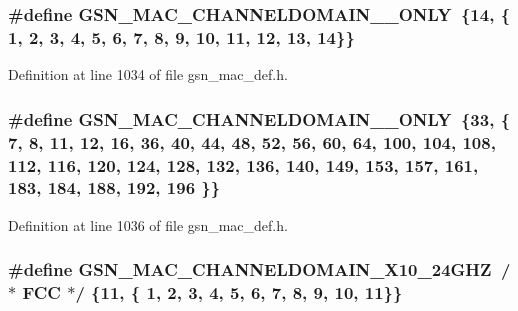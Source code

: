 \hypertarget{a00642_ga1902c2b82dd9530b1f76e7aa03cad775}{
\subsubsection[{GSN\_\-MAC\_\-CHANNELDOMAIN\_\-24\_\-ONLY}]{\setlength{\rightskip}{0pt plus 5cm}\#define GSN\_\-MAC\_\-CHANNELDOMAIN\_\_\-ONLY~\{14, \{ 1,  2,  3,  4,  5,  6,  7,  8,  9, 10, 11, 12, 13, 14\}\}}}
\label{a00642_ga1902c2b82dd9530b1f76e7aa03cad775}


Definition at line 1034 of file gsn\_\-mac\_\-def.h.

\hypertarget{a00642_ga700daf355821d5d26cb0d2f346a1a969}{
\subsubsection[{GSN\_\-MAC\_\-CHANNELDOMAIN\_\-5\_\-ONLY}]{\setlength{\rightskip}{0pt plus 5cm}\#define GSN\_\-MAC\_\-CHANNELDOMAIN\_\_\-ONLY~\{33, \{ 7,  8, 11, 12, 16, 36, 40, 44, 48, 52, 56, 60, 64, 100, 104, 108, 112, 116, 120, 124, 128, 132, 136, 140, 149, 153, 157, 161, 183, 184, 188, 192, 196 \}\}}}
\label{a00642_ga700daf355821d5d26cb0d2f346a1a969}


Definition at line 1036 of file gsn\_\-mac\_\-def.h.

\hypertarget{a00642_gadef528ef0222b55050b526f2acd1e545}{
\subsubsection[{GSN\_\-MAC\_\-CHANNELDOMAIN\_\-X10\_\-24GHZ}]{\setlength{\rightskip}{0pt plus 5cm}\#define GSN\_\-MAC\_\-CHANNELDOMAIN\_\-X10\_\-24GHZ~/$\ast$ FCC    $\ast$/ \{11, \{ 1,  2,  3,  4,  5,  6,  7,  8,  9, 10, 11\}\}}}
\label{a00642_gadef528ef0222b55050b526f2acd1e545}



